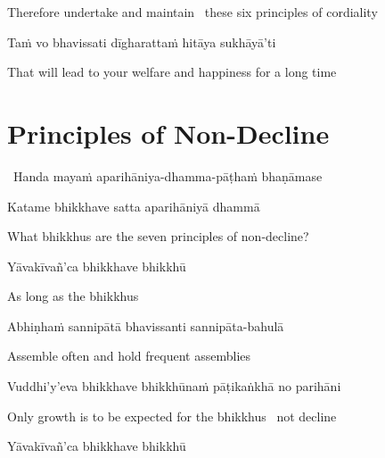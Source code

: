 \begin{english}
  Therefore undertake and maintain \breathmark\ these six principles of cordiality
\end{english}

Taṁ vo bhavissati dīgharattaṁ hitāya sukhāyā'ti

\begin{english}
  That will lead to your welfare and happiness for a long time
\end{english}

\suttaRef{[MN 104]}

\ifdigitalversion{}\fi



\section{Principles of Non-Decline}
\label{principles-of-non-decline}

\begin{leader}
  \anglebracketleft\ \hspace{-0.5mm}Handa mayaṁ aparihāniya-dhamma-pāṭhaṁ bhaṇāmase \hspace{-0.5mm}\anglebracketright\
\end{leader}

Katame bhikkhave satta aparihāniyā dhammā

\begin{english}
  What bhikkhus are the seven principles of non-decline?
\end{english}

Yāvakīvañ'ca bhikkhave bhikkhū

\begin{english}
  As long as the bhikkhus
\end{english}

Abhiṇhaṁ sannipātā bhavissanti sannipāta-bahulā

\begin{english}
  Assemble often and hold frequent assemblies
\end{english}

Vuddhi'y'eva bhikkhave bhikkhūnaṁ pāṭikaṅkhā no parihāni

\begin{english}
  Only growth is to be expected for the bhikkhus \breathmark\ not decline
\end{english}

Yāvakīvañ'ca bhikkhave bhikkhū

